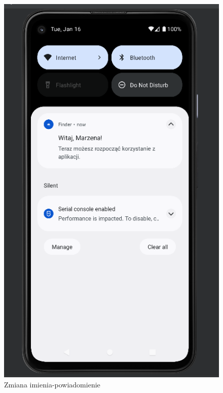 \begin{figure}[!hbt]
		\begin{center}
			\includegraphics[width=5.5 cm]{rys/pu/3.png}
			\caption{Zmiana imienia-powiadomienie}
			\label{rys:zmiana imienia-powiadomienie}
		\end{center}
	\end{figure}